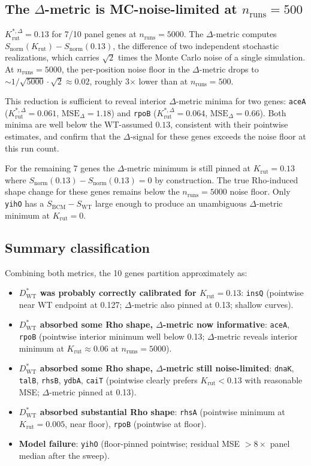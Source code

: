 \documentclass[11pt]{article}
\newcommand{\Krut}{K_{\text{rut}}}
\newcommand{\Dstar}{D^{\!*}}
\newcommand{\DstarWT}{\Dstar_{\text{WT}}}
\newcommand{\Snorm}{S_{\text{norm}}}
\newcommand{\SWT}{S_{\text{WT}}}
\newcommand{\SBCM}{S_{\text{BCM}}}
\begin{document}
\subsection{The $\Delta$-metric is MC-noise-limited at
  $n_{\text{runs}}=500$}

$K^{*,\Delta}_{\text{rut}} = 0.13$ for 7/10 panel genes at
$n_{\text{runs}} = 5000$. The $\Delta$-metric computes
\(\Snorm(\Krut) - \Snorm(0.13)\), the difference of two independent
stochastic realizations, which carries $\sqrt 2$ times the Monte Carlo
noise of a single simulation. At $n_{\text{runs}} = 5000$, the
per-position noise floor in the $\Delta$-metric drops to
$\sim 1/\sqrt{5000} \cdot \sqrt{2} \approx 0.02$, roughly 3$\times$
lower than at $n_{\text{runs}} = 500$.

This reduction is sufficient to reveal interior $\Delta$-metric minima
for two genes: \texttt{aceA} ($K^{*,\Delta}_{\text{rut}} = 0.061$,
$\text{MSE}_\Delta = 1.18$) and \texttt{rpoB}
($K^{*,\Delta}_{\text{rut}} = 0.064$, $\text{MSE}_\Delta = 0.66$).
Both minima are well below the WT-assumed $0.13$, consistent with their
pointwise estimates, and confirm that the $\Delta$-signal for these
genes exceeds the noise floor at this run count.

For the remaining 7 genes the $\Delta$-metric minimum is still pinned at
$\Krut=0.13$ where $\Snorm(0.13) - \Snorm(0.13) = 0$ by construction.
The true Rho-induced shape change for these genes remains below the
$n_{\text{runs}} = 5000$ noise floor. Only \texttt{yihO} has a
$\SBCM - \SWT$ large enough to produce an unambiguous $\Delta$-metric
minimum at $\Krut = 0$.

\subsection{Summary classification}

Combining both metrics, the 10 genes partition approximately as:

\begin{itemize}
\item \textbf{$\DstarWT$ was probably correctly calibrated for
  $\Krut=0.13$}: \texttt{insQ} (pointwise near WT endpoint at 0.127;
  $\Delta$-metric also pinned at 0.13; shallow curves).
\item \textbf{$\DstarWT$ absorbed some Rho shape, $\Delta$-metric now
  informative}: \texttt{aceA}, \texttt{rpoB} (pointwise interior
  minimum well below 0.13; $\Delta$-metric reveals interior minimum at
  $\Krut \approx 0.06$ at $n_{\text{runs}}=5000$).
\item \textbf{$\DstarWT$ absorbed some Rho shape, $\Delta$-metric still
  noise-limited}: \texttt{dnaK}, \texttt{talB}, \texttt{rhsB},
  \texttt{ydbA}, \texttt{caiT} (pointwise clearly prefers $\Krut <
  0.13$ with reasonable MSE; $\Delta$-metric pinned at 0.13).
\item \textbf{$\DstarWT$ absorbed substantial Rho shape}: \texttt{rhsA}
  (pointwise minimum at $\Krut = 0.005$, near floor),
  \texttt{rpoB} (pointwise at floor).
\item \textbf{Model failure}: \texttt{yihO} (floor-pinned pointwise;
  residual MSE $> 8\times$ panel median after the sweep).
\end{itemize}
\end{document}
